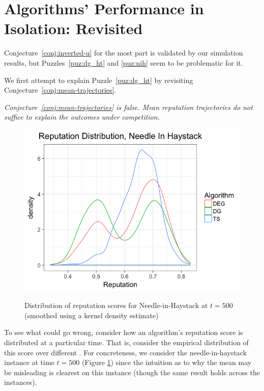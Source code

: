 \documentclass[../competing_bandits.tex]{subfiles}
\begin{document}
\section{Algorithms' Performance in Isolation: Revisited}\label{section:revisited}

Conjecture~\ref{conj:inverted-u} for the most part is validated by our simulation results, but Puzzles~\ref{puz:dg_ht} and \ref{puz:nih} seem to be problematic for it.

We first attempt to explain Puzzle~\ref{puz:dg_ht} by revisiting Conjecture~\ref{conj:mean-trajectories}.

\begin{finding}
\textit{
Conjecture~\ref{conj:mean-trajectories} is false. Mean reputation trajectories do not suffice to explain the outcomes under competition.}
\end{finding}

\begin{figure}[ht]
\caption{Distribution of reputation scores for Needle-in-Haystack at $t=500$ (smoothed using a kernel density estimate)}
\includegraphics[scale=0.35]{figures/rep_distribution_nih}
\label{rep_dist_nih}
\end{figure}

To see what could go wrong, consider how an algorithm's reputation score is distributed at a particular time. That is, consider the empirical distribution of this score over different \MRVs. For concreteness, we consider the needle-in-haystack instance at time $t=500$ (Figure \ref{rep_dist_nih}) since the intuition as to why the mean may be misleading is clearest on this instance (though the same result holds across the instances).
\end{document}

